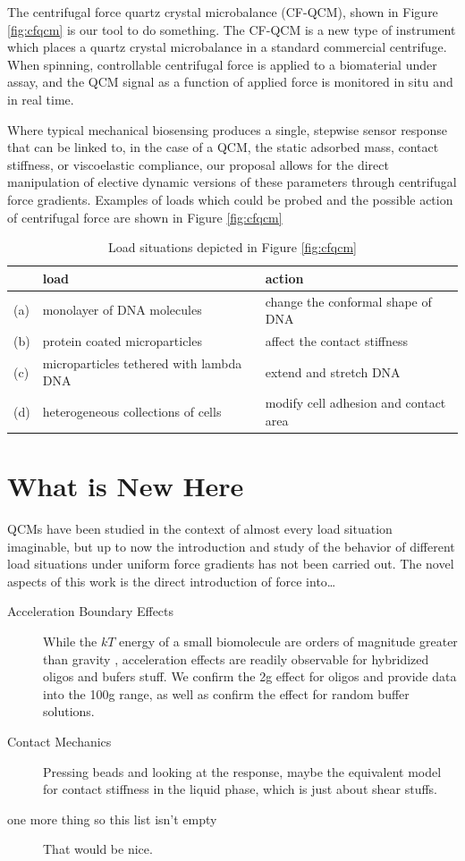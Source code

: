 \documentclass[a4paper,titlepage,onecolumn]{report}
\makeatletter
\newcommand{\Figure}[1]{Figure \ref{#1}}
\renewcommand{\todo}[2][]{\tikzexternaldisable\@todo[#1]{#2}\tikzexternalenable}
\makeatother
\begin{document}
The centrifugal force quartz crystal microbalance (CF-QCM), shown in
\Figure{fig:cfqcm} is our tool to do something.  The CF-QCM is a new type
of instrument which places a quartz crystal microbalance in a standard
commercial centrifuge.  When spinning, controllable centrifugal force is
applied to a biomaterial under assay, and the QCM signal as a function of
applied force is monitored in situ and in real time.

Where typical mechanical biosensing produces a single, stepwise sensor
response that can be linked to, in the case of a QCM, the static adsorbed
mass, contact stiffness, or viscoelastic compliance, our proposal allows
for the direct manipulation of elective dynamic versions of these
parameters through centrifugal force gradients.
Examples of loads which could be probed and the possible action of
centrifugal force are shown in \Figure{fig:cfqcm}
\begin{table}
 \centering
\begin{tabular}{lll}
\toprule
& load & action\\
\midrule
(a)& monolayer of DNA molecules& change the conformal shape of DNA\\
(b)& protein coated microparticles& affect the contact stiffness\\
(c)& microparticles tethered with lambda DNA& extend and stretch DNA\\
(d)& heterogeneous collections of cells& modify cell adhesion and contact area\\
\bottomrule
\end{tabular}
\caption{Load situations depicted in \Figure{fig:cfqcm}}
\end{table}

\section{What is New Here}
QCMs have been studied in the context of almost every load situation
imaginable, but up to now the introduction and study of the behavior of
different load situations under uniform force gradients has not been
carried out.
The novel aspects of this work is the direct introduction of force
into\dots

\begin{description}
\item[{Acceleration Boundary Effects}] While the $kT$ energy of a
small biomolecule are orders of magnitude greater than gravity\todo{energy, gravity, huh?}
, acceleration effects are readily observable for hybridized
oligos and bufers stuff.  We confirm the 2g effect for oligos and provide
data into the 100g range, as well as confirm the effect for random buffer
solutions.
\item[{Contact Mechanics}] Pressing beads and looking at the response,
 maybe the equivalent model for contact stiffness in the liquid phase,
 which is just about shear stuffs.
\item[{one more thing so this list isn't empty}] That would be nice.
\end{description}
\end{document}
